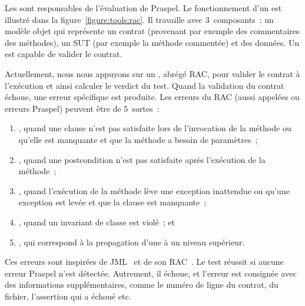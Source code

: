 Les  sont responsables de l'évaluation de Praspel.
Le fonctionnement d'un  est illustré dans la
figure~\ref{figure:tools:rac}. Il travaille avec 3~composants~: un modèle objet
 qui représente un contrat (provenant par exemple des commentaires
des méthodes), un SUT  (par exemple la méthode commentée) et des
données. Un  est capable de valider le contrat.

Actuellement, nous nous appuyons sur un ,
abrégé RAC, pour valider le contrat à l'exécution et ainsi calculer le verdict
du test. Quand la validation du contrat échoue, une erreur spécifique est
produite. Les erreurs du RAC (aussi appelées  ou
erreurs Praspel) peuvent être de 5~sortes~:
%
\begin{enumerate}

\item {}, quand une clause \arequires n'est pas
satisfaite lors de l'invocation de la méthode ou qu'elle est manquante et que la
méthode a besoin de paramètres~;

\item {}, quand une postcondition n'est pas
satisfaite après l'exécution de la méthode~;

\item {}, quand l'exécution de la méthode lève une
exception inattendue ou qu'une exception est levée et que la clause \athrowable
est manquante~;

\item {}, quand un invariant de classe est violé~; et

\item {}, qui correspond à la propagation
d'une  à un niveau supérieur.

\end{enumerate}
%
Ces erreurs sont inspirées de JML~ et de son RAC~.
Le test réussit si aucune erreur Praspel n'est détectée. Autrement, il échoue,
et l'erreur est consignée avec des informations supplémentaires, comme le numéro
de ligne du contrat, du fichier, l'assertion qui a échoué etc.

